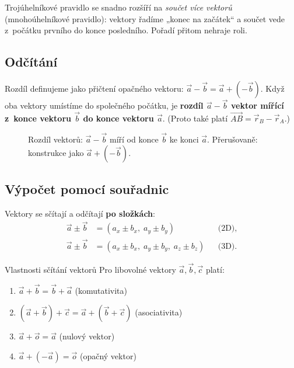 \documentclass[a4paper,11pt]{article}
\begin{document}
Trojúhelníkové pravidlo se snadno rozšíří na \emph{součet více vektorů}
(mnohoúhelníkové pravidlo): vektory řadíme „konec na začátek“ a součet vede
z~počátku prvního do konce posledního. Pořadí přitom nehraje roli.

\subsection{Odčítání}

Rozdíl definujeme jako přičtení opačného vektoru: $\vec a-\vec b=\vec a+(-\vec b)$.
Když oba vektory umístíme do společného počátku, je \textbf{rozdíl $\vec a-\vec b$
vektor mířící z~konce vektoru $\vec b$ do konce vektoru $\vec a$}. (Proto také platí
$\overrightarrow{AB}=\vec r_B-\vec r_A$.)

\begin{figure}[!htbp]
\centering
{}
\caption{Rozdíl vektorů: $\vec a-\vec b$ míří od konce $\vec b$ ke konci $\vec a$.
Přerušovaně: konstrukce jako $\vec a+(-\vec b)$.}
\end{figure}

\subsection{Výpočet pomocí souřadnic}

Vektory se sčítají a odčítají \textbf{po složkách}:
\begin{align}
  \vec a\pm\vec b&=(a_x\pm b_x,\;a_y\pm b_y)&&\text{(2D)},\\
  \vec a\pm\vec b&=(a_x\pm b_x,\;a_y\pm b_y,\;a_z\pm b_z)&&\text{(3D)}.
\end{align}

\begin{veta}{Vlastnosti sčítání vektorů}
Pro libovolné vektory $\vec a,\vec b,\vec c$ platí:
\begin{enumerate}[label=(\roman*),nosep]
  \item $\vec a+\vec b=\vec b+\vec a$ \hfill (komutativita)
  \item $(\vec a+\vec b)+\vec c=\vec a+(\vec b+\vec c)$ \hfill (asociativita)
  \item $\vec a+\vec o=\vec a$ \hfill (nulový vektor)
  \item $\vec a+(-\vec a)=\vec o$ \hfill (opačný vektor)
\end{enumerate}
\end{veta}
\end{document}
